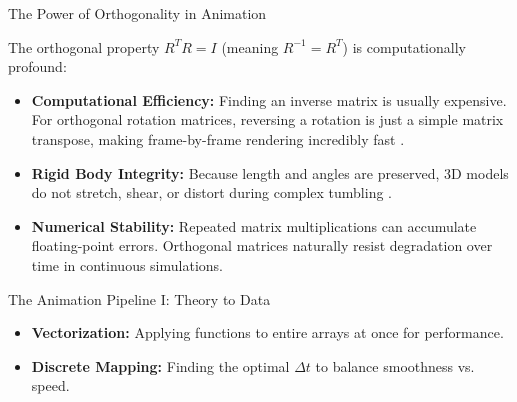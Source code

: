 \documentclass{beamer}
\begin{document}
\begin{frame}{The Power of Orthogonality in Animation}

The orthogonal property $R^TR = I$ (meaning $R^{-1} = R^T$) is computationally profound:

\vspace{0.3cm}
\begin{itemize}
\item \textbf{Computational Efficiency:} Finding an inverse matrix is usually expensive. For orthogonal rotation matrices, reversing a rotation is just a simple matrix transpose, making frame-by-frame rendering incredibly fast \cite{numpy}.
\vspace{0.2cm}
\item \textbf{Rigid Body Integrity:} Because length and angles are preserved, 3D models do not stretch, shear, or distort during complex tumbling \cite{friedberg}.
\vspace{0.2cm}
\item \textbf{Numerical Stability:} Repeated matrix multiplications can accumulate floating-point errors. Orthogonal matrices naturally resist degradation over time in continuous simulations.
\end{itemize}

\end{frame}
\begin{frame}{The Animation Pipeline I: Theory to Data}

\vspace{0.4cm}
\begin{itemize}
    \item \textbf{Vectorization:} Applying functions to entire arrays at once for performance.
    \item \textbf{Discrete Mapping:} Finding the optimal $\Delta t$ to balance smoothness vs. speed.
\end{itemize}
\end{frame}
\end{document}

